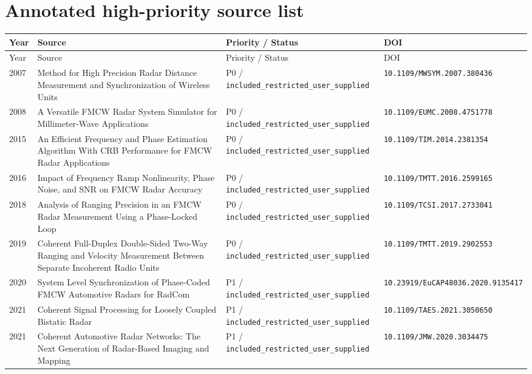 \documentclass[11pt]{article}
\begin{document}
\section{Annotated high-priority source list}
\small
\begin{longtable}{@{}p{}p{}p{}p{}@{}}
\toprule Year & Source & Priority / Status & DOI \\ \midrule
\endfirsthead
\toprule Year & Source & Priority / Status & DOI \\ \midrule
\endhead
2007 & Method for High Precision Radar Distance Measurement and Synchronization of Wireless Units & P0 / \nolinkurl{included_restricted_user_supplied} & \nolinkurl{10.1109/MWSYM.2007.380436} \\
2008 & A Versatile FMCW Radar System Simulator for Millimeter-Wave Applications & P0 / \nolinkurl{included_restricted_user_supplied} & \nolinkurl{10.1109/EUMC.2008.4751778} \\
2015 & An Efficient Frequency and Phase Estimation Algorithm With CRB Performance for FMCW Radar Applications & P0 / \nolinkurl{included_restricted_user_supplied} & \nolinkurl{10.1109/TIM.2014.2381354} \\
2016 & Impact of Frequency Ramp Nonlinearity, Phase Noise, and SNR on FMCW Radar Accuracy & P0 / \nolinkurl{included_restricted_user_supplied} & \nolinkurl{10.1109/TMTT.2016.2599165} \\
2018 & Analysis of Ranging Precision in an FMCW Radar Measurement Using a Phase-Locked Loop & P0 / \nolinkurl{included_restricted_user_supplied} & \nolinkurl{10.1109/TCSI.2017.2733041} \\
2019 & Coherent Full-Duplex Double-Sided Two-Way Ranging and Velocity Measurement Between Separate Incoherent Radio Units & P0 / \nolinkurl{included_restricted_user_supplied} & \nolinkurl{10.1109/TMTT.2019.2902553} \\
2020 & System Level Synchronization of Phase-Coded FMCW Automotive Radars for RadCom & P1 / \nolinkurl{included_restricted_user_supplied} & \nolinkurl{10.23919/EuCAP48036.2020.9135417} \\
2021 & Coherent Signal Processing for Loosely Coupled Bistatic Radar & P1 / \nolinkurl{included_restricted_user_supplied} & \nolinkurl{10.1109/TAES.2021.3050650} \\
2021 & Coherent Automotive Radar Networks: The Next Generation of Radar-Based Imaging and Mapping & P1 / \nolinkurl{included_restricted_user_supplied} & \nolinkurl{10.1109/JMW.2020.3034475} \\

\end{longtable}
\end{document}
